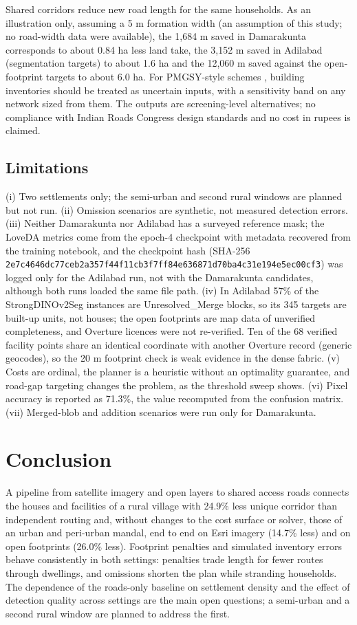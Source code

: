 \documentclass[journal]{IEEEtran}
\begin{document}
Shared corridors reduce new road length for the same households. As an illustration only, assuming a 5 m formation width (an assumption of this study; no road-width data were available), the 1,684 m saved in Damarakunta corresponds to about 0.84 ha less land take, the 3,152 m saved in Adilabad (segmentation targets) to about 1.6 ha and the 12,060 m saved against the open-footprint targets to about 6.0 ha. For PMGSY-style schemes \cite{pmgsy}, building inventories should be treated as uncertain inputs, with a sensitivity band on any network sized from them. The outputs are screening-level alternatives; no compliance with Indian Roads Congress design standards and no cost in rupees is claimed.

\subsection{Limitations}

(i) Two settlements only; the semi-urban and second rural windows are planned but not run. (ii) Omission scenarios are synthetic, not measured detection errors. (iii) Neither Damarakunta nor Adilabad has a surveyed reference mask; the LoveDA metrics come from the epoch-4 checkpoint with metadata recovered from the training notebook, and the checkpoint hash (SHA-256 \texttt{2e7c4646dc77ceb2\allowbreak a357f44f11cb3f7f\allowbreak f84e636871d70ba4\allowbreak c31e194e5ec00cf3}) was logged only for the Adilabad run, not with the Damarakunta candidates, although both runs loaded the same file path. (iv) In Adilabad 57\% of the StrongDINOv2Seg instances are Unresolved\_Merge blocks, so its 345 targets are built-up units, not houses; the open footprints are map data of unverified completeness, and Overture licences were not re-verified. Ten of the 68 verified facility points share an identical coordinate with another Overture record (generic geocodes), so the 20 m footprint check is weak evidence in the dense fabric. (v) Costs are ordinal, the planner is a heuristic without an optimality guarantee, and road-gap targeting changes the problem, as the threshold sweep shows. (vi) Pixel accuracy is reported as 71.3\%, the value recomputed from the confusion matrix. (vii) Merged-blob and addition scenarios were run only for Damarakunta.

\section{Conclusion}

A pipeline from satellite imagery and open layers to shared access roads connects the houses and facilities of a rural village with 24.9\% less unique corridor than independent routing and, without changes to the cost surface or solver, those of an urban and peri-urban mandal, end to end on Esri imagery (14.7\% less) and on open footprints (26.0\% less). Footprint penalties and simulated inventory errors behave consistently in both settings: penalties trade length for fewer routes through dwellings, and omissions shorten the plan while stranding households. The dependence of the roads-only baseline on settlement density and the effect of detection quality across settings are the main open questions; a semi-urban and a second rural window are planned to address the first.
\end{document}
